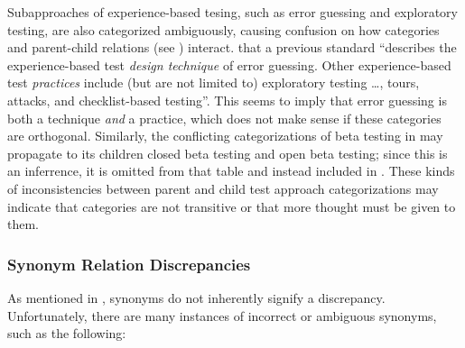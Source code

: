 Subapproaches of experience-based tesing, such as error guessing and
exploratory testing, are also categorized ambiguously, causing confusion on how
categories and parent-child relations (see ) interact.
 \citet[p.~34\ifnotpaper, emphasis added\fi]{IEEE2022}
 that a previous standard \citeyearpar{IEEE2021}
``describes the experience-based test \emph{design technique} of error
guessing. Other experience-based test \emph{practices} include (but are not
limited to) exploratory testing \dots, tours, attacks, and checklist-based
testing''. This seems to imply that error guessing is both a technique
\emph{and} a practice, which does not make sense if these categories are
orthogonal. \ifnotpaper Similarly, the conflicting categorizations of beta
    testing in  may propagate to its children closed beta
    testing and open beta testing; since this is an inferrence, it is omitted
    from that table and instead included in . \fi These
kinds of inconsistencies between parent and child test approach categorizations
may indicate that categories are not transitive or that more thought must be
given to them.

\ifnotpaper
    \begin{landscape}
        
    \end{landscape}
\else %
\fi

\subsubsection{Synonym Relation Discrepancies}
\label{syns}

As mentioned in , synonyms do not inherently signify a
discrepancy. Unfortunately, there are many instances of incorrect or ambiguous
synonyms, such as the following:



